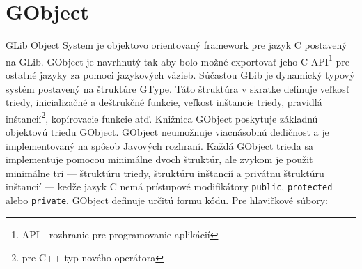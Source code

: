 \documentclass[12pt,oneside,final]{fithesis2}
\begin{document}
\section{GObject}
GLib Object System je objektovo orientovaný framework pre jazyk C postavený na GLib. GObject je navrhnutý tak aby bolo možné exportovať jeho C-API\footnote{API - rozhranie pre programovanie aplikácií} pre ostatné jazyky za pomoci jazykových väzieb. Súčasťou GLib je dynamický typový systém postavený na štruktúre GType. Táto štruktúra v skratke definuje veľkosť triedy, inicializačné a deštrukčné funkcie, veľkost inštancie triedy, pravidlá inštancií\footnote{pre C++ typ nového operátora}, kopírovacie funkcie atď. Knižnica GObject poskytuje základnú objektovú triedu GObject. GObject neumožnuje viacnásobnú dedičnost a je implementovaný na spôsob Javových rozhraní. Každá GObject trieda sa implementuje pomocou minimálne dvoch štruktúr, ale zvykom je použit minimálne tri --- štruktúru triedy, štruktúru inštancií a privátnu štruktúru inštancií --- kedže jazyk C nemá prístupové modifikátory \verb|public|, \verb|protected| alebo \verb|private|. GObject definuje určitú formu kódu.
Pre hlavičkové súbory: %
\end{document}
